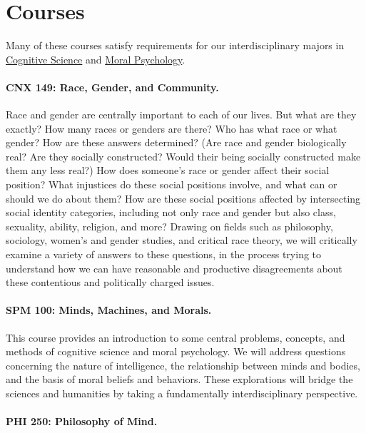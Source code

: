 \documentclass[%
  11pt,%
]{article}
\begin{document}
\section{Courses}

Many of these courses satisfy requirements for our interdisciplinary majors in \href{https://www.fandm.edu/fields-of-study/cognitive-science/index.html}{Cognitive Science} and \href{https://www.fandm.edu/fields-of-study/moral-psychology/index.html}{Moral Psychology}.
\medskip{}

\paragraph{CNX 149: Race, Gender, and Community.}

Race and gender are centrally important to each of our lives. But what are they exactly? How many races or genders are there? Who has what race or what gender? How are these answers determined? (Are race and gender biologically real? Are they socially constructed? Would their being socially constructed make them any less real?) How does someone's race or gender affect their social position? What injustices do these social positions involve, and what can or should we do about them? How are these social positions affected by intersecting social identity categories, including not only race and gender but also class, sexuality, ability, religion, and more? Drawing on fields such as philosophy, sociology, women's and gender studies, and critical race theory, we will critically examine a variety of answers to these questions, in the process trying to understand how we can have reasonable and productive disagreements about these contentious and politically charged issues.

\paragraph{SPM 100: Minds, Machines, and Morals.}

This course provides an introduction to some central problems, concepts, and methods of cognitive science and moral psychology. We will address questions concerning the nature of intelligence, the relationship between minds and bodies, and the basis of moral beliefs and behaviors. These explorations will bridge the sciences and humanities by taking a fundamentally interdisciplinary perspective.

\paragraph{PHI 250: Philosophy of Mind.}
\end{document}
